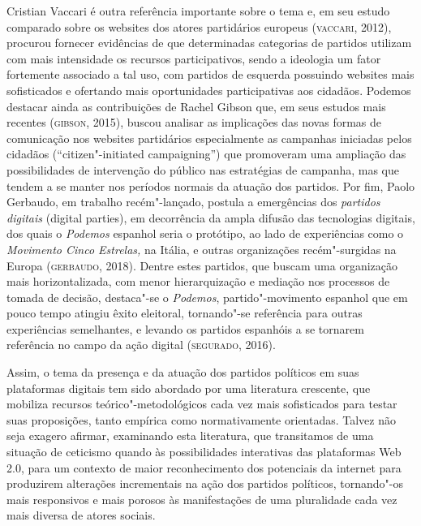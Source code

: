 Cristian Vaccari é outra referência importante sobre o tema e, em seu
estudo comparado sobre os websites dos atores partidários europeus
(\textsc{vaccari}, 2012), procurou fornecer evidências de que determinadas
categorias de partidos utilizam com mais intensidade os recursos
participativos, sendo a ideologia um fator fortemente associado a tal
uso, com partidos de esquerda possuindo websites mais sofisticados e
ofertando mais oportunidades participativas aos cidadãos. Podemos
destacar ainda as contribuições de Rachel Gibson que, em seus estudos
mais recentes (\textsc{gibson}, 2015), buscou analisar as implicações das novas
formas de comunicação nos websites partidários especialmente as
campanhas iniciadas pelos cidadãos (``citizen"-initiated campaigning'')
que promoveram uma ampliação das possibilidades de intervenção do
público nas estratégias de campanha, mas que tendem a se manter nos
períodos normais da atuação dos partidos. Por fim, Paolo Gerbaudo, em
trabalho recém"-lançado, postula a emergências dos \emph{partidos
digitais} (digital parties), em decorrência da ampla difusão das
tecnologias digitais, dos quais o \emph{Podemos} espanhol seria o
protótipo, ao lado de experiências como o \emph{Movimento Cinco
Estrelas,} na Itália, e outras organizações recém"-surgidas na Europa
(\textsc{gerbaudo}, 2018). Dentre estes partidos, que buscam uma organização mais
horizontalizada, com menor hierarquização e mediação nos processos de
tomada de decisão, destaca"-se o \emph{Podemos}, partido"-movimento
espanhol que em pouco tempo atingiu êxito eleitoral, tornando"-se
referência para outras experiências semelhantes, e levando os partidos
espanhóis a se tornarem referência no campo da ação digital (\textsc{segurado},
2016).

Assim, o tema da presença e da atuação dos partidos políticos em suas
plataformas digitais tem sido abordado por uma literatura crescente, que
mobiliza recursos teórico"-metodológicos cada vez mais sofisticados para
testar suas proposições, tanto empírica como normativamente orientadas.
Talvez não seja exagero afirmar, examinando esta literatura, que
transitamos de uma situação de ceticismo quando às possibilidades
interativas das plataformas Web 2.0, para um contexto de maior
reconhecimento dos potenciais da internet para produzirem alterações
incrementais na ação dos partidos políticos, tornando"-os mais
responsivos e mais porosos às manifestações de uma pluralidade cada vez
mais diversa de atores sociais.

